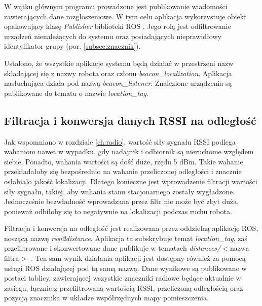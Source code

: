W wątku głównym programu prowadzone jest publikowanie wiadomości zawierających dane rozgłoszeniowe. W tym celu aplikacja wykorzystuje obiekt opakowujący klasę \textit{Publisher} biblioteki ROS \cite{agitr}. Jego rolą jest odfiltrowanie urządzeń nienależących do systemu oraz posiadających nieprawidłowy identyfikator grupy (por. \ref{subsec:znacznik}). 

Ustalono, że wszystkie aplikacje systemu będą działać w przestrzeni nazw składającej się z nazwy robota oraz członu \textit{beacon{\_}localization}. Aplikacja nasłuchująca działa pod nazwą \textit{beacon{\_}listener}. Znalezione urządzenia są publikowane do tematu o nazwie \textit{location{\_}tag}. 

\subsection{Filtracja i konwersja danych RSSI na odległość}
\label{subsec:filtracja_rssi}

Jak wspomniano w rozdziale \ref{ch:radio}, wartość siły sygnału RSSI podlega wahaniom nawet w wypadku, gdy nadajnik i odbiornik są nieruchome względem siebie. Ponadto, wahania wartości są dość duże, rzędu 5 dBm. Takie wahanie przekładałoby się bezpośrednio na wahanie przeliczonej odległości i znacznie osłabiało jakość lokalizacji. Dlatego konieczne jest wprowadzenie filtracji wartości siły sygnału, takiej, aby wahania stanu stacjonarnego zostały wygładzone. Jednocześnie bezwładność wprowadzana przez filtr nie może być zbyt duża, ponieważ odbiłoby się to negatywnie na lokalizacji podczas ruchu robota. 

Filtracja i konwersja na odległość jest realizowana przez oddzielną aplikację ROS, noszącą nazwę \textit{rssi2distance}. Aplikacja ta subskrybuje temat \textit{location{\_}tag}, zaś przefiltrowane i skonwertowane dane publikuje w tematach \textit{distances/}$<$nazwa filtra$>$ . Ten sam wynik działania aplikacji jest dostępny również za pomocą usługi ROS działającej pod tą samą nazwą. Dane wynikowe są publikowane w postaci tablicy, zawierającej wszystkie znaczniki radiowe będące aktualnie w zasięgu, łącznie z przefiltrowaną wartością RSSI, przeliczoną odległością oraz pozycją znacznika w układze współrzędnych mapy pomieszczenia.

